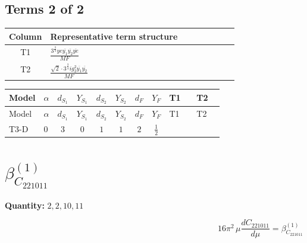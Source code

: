 \documentclass[8pt]{article}
\begin{document}
\begin{landscape}
\subsection*{Terms 2 of 2}
\begin{center}
\begin{tabular}{@{}c >{\raggedright\arraybackslash}p{0.82\linewidth}@{}}
\toprule
Column & Representative term structure \\
\midrule
T1 & \(\displaystyle \frac{3^{\frac{3}{4}} ye \overline{y_{1}} \overline{y_{2}} \overline{ye}}{MF}\) \\
\midrule
T2 & \(\displaystyle \frac{\sqrt{2} \cdot 3^{\frac{3}{4}} i g_{2}^{2} \overline{y_{1}} \overline{y_{2}}}{MF}\) \\
\midrule
\bottomrule
\end{tabular}
\end{center}
\smallskip
\tiny
\begin{longtable}{@{}llcccccc >{\raggedright\arraybackslash}p{0.21\linewidth} >{\raggedright\arraybackslash}p{0.21\linewidth}@{}}
\toprule
Model & $\alpha$ & $d_{S_1}$ & $Y_{S_1}$ & $d_{S_2}$ & $Y_{S_2}$ & $d_F$ & $Y_F$ & T1 & T2 \\
\midrule
\endfirsthead
\toprule
Model & $\alpha$ & $d_{S_1}$ & $Y_{S_1}$ & $d_{S_2}$ & $Y_{S_2}$ & $d_F$ & $Y_F$ & T1 & T2 \\
\midrule
\endhead
T3-D & $0$ & $3$ & $0$ & $1$ & $1$ & $2$ & $\frac{1}{2}$ & \scriptsize\adjustbox{max width=\linewidth}{$\begin{gathered} - \frac{3^{\frac{3}{4}} ye \overline{y_{1}} \overline{y_{2}} \overline{ye}}{12 MF}\end{gathered}$} & \scriptsize\adjustbox{max width=\linewidth}{$\begin{gathered} - \frac{\sqrt{2} \cdot 3^{\frac{3}{4}} i g_{2}^{2} \overline{y_{1}} \overline{y_{2}}}{3 MF}\end{gathered}$} \\
\midrule
\bottomrule
\end{longtable}
\clearpage
\section*{$\beta_{C_{221011}}^{(1)}$}
\noindent\textbf{Quantity: }$\mathrm{2,2,10,11}$\par\smallskip
\[16\pi^2\,\mu\frac{d C_{221011}}{d\mu}=\beta_{C_{221011}}^{(1)}\]

\end{landscape}
\end{document}
